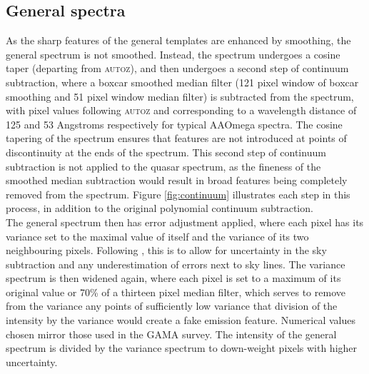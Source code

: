 \documentclass[iop]{emulateapj}
\newcommand{\autoz}{\textsc{autoz}}
\begin{document}
\subsection{General spectra}

As the sharp features of the general templates are enhanced by smoothing, the general spectrum is not smoothed. Instead, the spectrum undergoes a cosine taper (departing from \autoz{}), and then undergoes a second step of continuum subtraction, where a boxcar smoothed median filter (121 pixel window of boxcar smoothing and 51 pixel window median filter) is subtracted from the spectrum, with pixel values following \autoz{} and corresponding to a wavelength distance of 125 and 53 Angstroms respectively for typical AAOmega spectra. The cosine tapering of the spectrum ensures that features are not introduced at points of discontinuity at the ends of the spectrum.  This second step of continuum subtraction is not applied to the quasar spectrum, as the fineness of the smoothed median subtraction would result in broad features being completely removed from the spectrum. Figure \ref{fig:continuum} illustrates each step in this process, in addition to the original polynomial continuum subtraction.\\

The general spectrum then has error adjustment applied, where each pixel has its variance set to the maximal value of itself and the variance of its two neighbouring pixels. Following \citet{baldry2014galaxy}, this is to allow for uncertainty in the sky subtraction and any underestimation of errors next to sky lines. The variance spectrum is then widened again, where each pixel is set to a maximum of its original value or 70\% of a thirteen pixel median filter, which serves to remove from the variance any points of sufficiently low variance that division of the intensity by the variance would create a fake emission feature. Numerical values chosen mirror those used in the GAMA survey. The intensity of the general spectrum is divided by the variance spectrum to down-weight pixels with higher uncertainty. 
\end{document}
